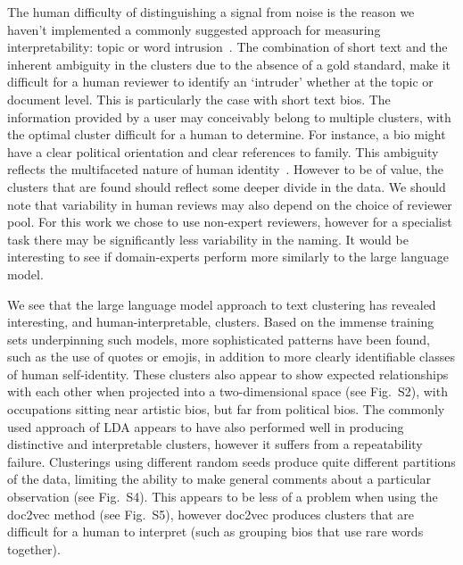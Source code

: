 \documentclass{article}
\begin{document}
The human difficulty of distinguishing a signal from noise is the reason we haven't implemented a commonly suggested approach for measuring interpretability: topic or word intrusion~\cite{chang2009}.  The combination of short text and the inherent ambiguity in the clusters due to the absence of a gold standard, make it difficult for a human reviewer to identify an `intruder' whether at the topic or document level.  This is particularly the case with short text bios.  The information provided by a user may conceivably belong to multiple clusters, with the optimal cluster difficult for a human to determine. For instance, a bio might have a clear political orientation and clear references to family.  This ambiguity reflects the multifaceted nature of human identity~\cite{mackinnon2010}.  However to be of value, the clusters that are found should reflect some deeper divide in the data.  We should note that variability in human reviews may also depend on the choice of reviewer pool.  For this work we chose to use non-expert reviewers, however for a specialist task there may be significantly less variability in the naming.  It would be interesting to see if domain-experts perform more similarly to the large language model.




We see that the large language model approach to text clustering has revealed interesting, and human-interpretable, clusters.  Based on the immense training sets underpinning such models, more sophisticated patterns have been found, such as the use of quotes or emojis, in addition to more clearly identifiable classes of human self-identity.  These clusters also appear to show expected relationships with each other when projected into a two-dimensional space (see Fig.~S2), with occupations sitting near artistic bios, but far from political bios.  The commonly used approach of LDA appears to have also performed well in producing distinctive and interpretable clusters, however it suffers from a repeatability failure.  Clusterings using different random seeds produce quite different partitions of the data, limiting the ability to make general comments about a particular observation (see Fig.~S4).  This appears to be less of a problem when using the doc2vec method (see Fig.~S5), however doc2vec produces clusters that are difficult for a human to interpret (such as grouping bios that use rare words together).    
\end{document}
